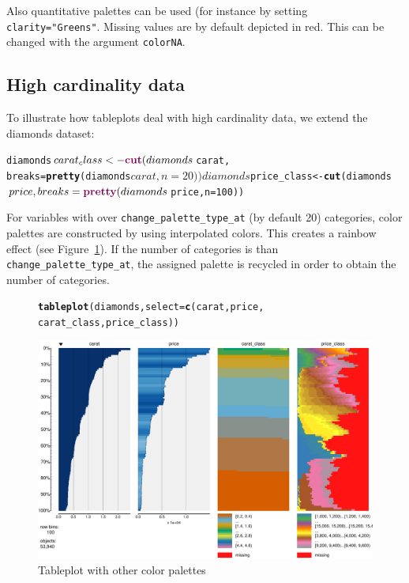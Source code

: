 \documentclass[11pt, fleqn, a4paper]{article}\usepackage{graphicx, color}
\makeatletter
\def\maxwidth{ %
  \ifdim\Gin@nat@width>\linewidth
    \linewidth
  \else
    \Gin@nat@width
  \fi
}
\newcommand{\hlfunctioncall}[1]{\textcolor[rgb]{0.501960784313725,0,0.329411764705882}{\textbf{#1}}}%
\newenvironment{kframe}{%
 \def\at@end@of@kframe{}%
 \ifinner\ifhmode%
  \def\at@end@of@kframe{\end{minipage}}%
  \begin{minipage}{\columnwidth}%
 \fi\fi%
 \def\FrameCommand##1{\hskip\@totalleftmargin \hskip-\fboxsep
 \colorbox{shadecolor}{##1}\hskip-\fboxsep
     \hskip-\linewidth \hskip-\@totalleftmargin \hskip\columnwidth}%
 \MakeFramed {\advance\hsize-\width
   \@totalleftmargin\z@ \linewidth\hsize
   \@setminipage}}%
 {\par\unskip\endMakeFramed%
 \at@end@of@kframe}
\newenvironment{knitrout}{}{} %
\makeatother
\begin{document}
Also quantitative palettes can be used (for instance by setting {\tt clarity="Greens"}. Missing values are by default depicted in red. This can be changed with the argument {\tt colorNA}.

\subsection{High cardinality data}
To illustrate how tableplots deal with high cardinality data, we extend the diamonds dataset:

\begin{knitrout}
\color{fgcolor}\begin{kframe}
\begin{alltt}
diamonds$carat_class <- \hlfunctioncall{cut}(diamonds$carat, 
    breaks = \hlfunctioncall{pretty}(diamonds$carat, n = 20))
diamonds$price_class <- \hlfunctioncall{cut}(diamonds$price, 
    breaks = \hlfunctioncall{pretty}(diamonds$price, n = 100))
\end{alltt}
\end{kframe}
\end{knitrout}


For variables with over {\tt change\_palette\_type\_at} (by default 20) categories, color palettes are constructed by using interpolated colors. This creates a rainbow effect (see Figure~\ref{fig:tphc}). If the number of categories is than {\tt change\_palette\_type\_at}, the assigned palette is recycled in order to obtain the number of categories.

\begin{figure}[htp]
\begin{knitrout}
\color{fgcolor}\begin{kframe}
\begin{alltt}
\hlfunctioncall{tableplot}(diamonds, select = \hlfunctioncall{c}(carat, price, 
    carat_class, price_class))
\end{alltt}
\end{kframe}
\includegraphics[width=\maxwidth]{figure/chunk9} 

\end{knitrout}

\caption{Tableplot with other color palettes}
\label{fig:tphc}
\end{figure}
\end{document}
